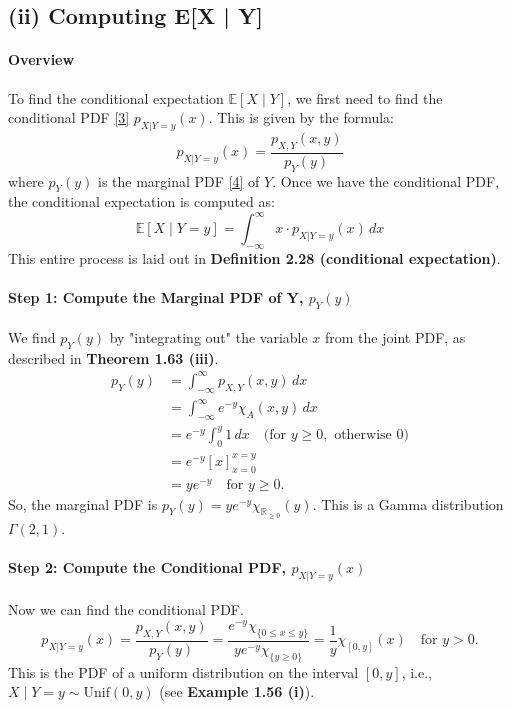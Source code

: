 \documentclass[11pt,a4paper]{article}
\begin{document}
\subsection{(ii) Computing E[X | Y]}

\paragraph{Overview}
To find the conditional expectation $\mathbb{E}[X \mid Y]$, we first need to find the conditional PDF \hyperlink{ref:cond_pdf}{[3]} $p_{X|Y=y}(x)$. This is given by the formula:
\[
p_{X|Y=y}(x) = \frac{p_{X,Y}(x,y)}{p_Y(y)}
\]
where $p_Y(y)$ is the marginal PDF \hyperlink{ref:marginal}{[4]} of $Y$. Once we have the conditional PDF, the conditional expectation is computed as:
\[
\mathbb{E}[X \mid Y=y] = \int_{-\infty}^{\infty} x \cdot p_{X|Y=y}(x) \,dx
\]
This entire process is laid out in \textbf{Definition 2.28 (conditional expectation)}.

\paragraph{Step 1: Compute the Marginal PDF of Y, $p_Y(y)$}
We find $p_Y(y)$ by "integrating out" the variable $x$ from the joint PDF, as described in \textbf{Theorem 1.63 (iii)}.
\begin{align*}
    p_Y(y) &= \int_{-\infty}^{\infty} p_{X,Y}(x,y) \,dx \\
    &= \int_{-\infty}^{\infty} e^{-y} \chi_A(x,y) \,dx \\
    &= e^{-y} \int_{0}^{y} 1 \,dx \quad \text{(for } y \ge 0, \text{ otherwise 0)} \\
    &= e^{-y} \left[ x \right]_{x=0}^{x=y} \\
    &= y e^{-y} \quad \text{for } y \ge 0.
\end{align*}
So, the marginal PDF is $p_Y(y) = y e^{-y} \chi_{\mathbb{R}_{\ge 0}}(y)$. This is a Gamma distribution $\Gamma(2,1)$.

\paragraph{Step 2: Compute the Conditional PDF, $p_{X|Y=y}(x)$}
Now we can find the conditional PDF.
\[
p_{X|Y=y}(x) = \frac{p_{X,Y}(x,y)}{p_Y(y)} = \frac{e^{-y} \chi_{\{0 \le x \le y\}}}{y e^{-y} \chi_{\{y \ge 0\}}} = \frac{1}{y} \chi_{[0,y]}(x) \quad \text{for } y > 0.
\]
This is the PDF of a uniform distribution on the interval $[0, y]$, i.e., $X \mid Y=y \sim \text{Unif}(0,y)$ (see \textbf{Example 1.56 (i)}).
\end{document}
